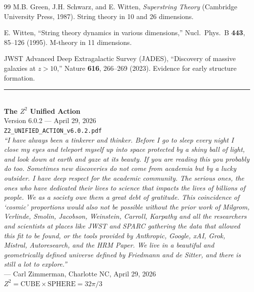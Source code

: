 \documentclass[11pt,a4paper]{article}
\theoremstyle{plain}
\theoremstyle{definition}
\theoremstyle{remark}
\begin{document}
\begin{thebibliography}{99}
 M.B. Green, J.H. Schwarz, and E. Witten, \emph{Superstring Theory} (Cambridge University Press, 1987). String theory in 10 and 26 dimensions.

 E. Witten, ``String theory dynamics in various dimensions,'' Nucl.\ Phys.\ B \textbf{443}, 85--126 (1995). M-theory in 11 dimensions.

 JWST Advanced Deep Extragalactic Survey (JADES), ``Discovery of massive galaxies at $z > 10$,'' Nature \textbf{616}, 266--269 (2023). Evidence for early structure formation.

\end{thebibliography}

\vspace{2cm}
\begin{center}
\rule{0.8\textwidth}{0.5pt}\\[0.5cm]
\textbf{The $Z^2$ Unified Action}\\[0.3cm]
Version 6.0.2 --- April 29, 2026\\[0.3cm]
\texttt{Z2\_UNIFIED\_ACTION\_v6.0.2.pdf}\\[0.5cm]

\emph{``I have always been a tinkerer and thinker. Before I go to sleep every night I close my eyes and teleport myself up into space protected by a shiny ball of light, and look down at earth and gaze at its beauty. If you are reading this you probably do too. Sometimes new discoveries do not come from academia but by a lucky outsider. I have deep respect for the academic community. The serious ones, the ones who have dedicated their lives to science that impacts the lives of billions of people. We as a society owe them a great debt of gratitude. This coincidence of `cosmic' proportions would also not be possible without the prior work of Milgrom, Verlinde, Smolin, Jacobson, Weinstein, Carroll, Karpathy and all the researchers and scientists at places like JWST and SPARC gathering the data that allowed this fit to be found, or the tools provided by Anthropic, Google, xAI, Grok, Mistral, Autoresearch, and the HRM Paper. We live in a beautiful and geometrically defined universe defined by Friedmann and de Sitter, and there is still a lot to explore.''}\\[0.3cm]
--- Carl Zimmerman, Charlotte NC, April 29, 2026\\[0.5cm]

\textbf{$Z^2 = \text{CUBE} \times \text{SPHERE} = 32\pi/3$}
\end{center}
\end{document}
